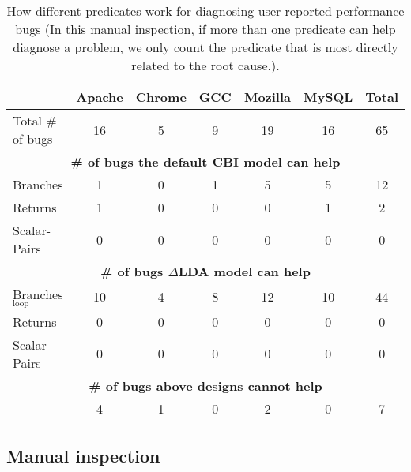 \begin{table*}[tb!]
\begin{adjustwidth}{-.5in}{-.5in}
\scriptsize
\centering
{
\begin{tabular}{lcccccc}
\toprule
&Apache&Chrome&GCC&Mozilla&MySQL&Total\\
\midrule
Total \# of bugs  & 16 & 5 & 9 & 19 & 16 & 65 \\
\midrule
\multicolumn{7}{c}{\bf \# of bugs the default CBI model can help}\\
\multicolumn{1}{l}{{ Branches} }
&1&0&1&5&5&12\\
\multicolumn{1}{l}{{ Returns} }
&1&0&0&0&1&2\\
\multicolumn{1}{l}{{ Scalar-Pairs} }
 &0&0&0&0&0&0\\
\midrule
\multicolumn{7}{c}{\bf \# of bugs $\Delta$LDA model can help}\\
\multicolumn{1}{l}{{ Branches$_{\text{loop}}$} }
&10&4&8&12&10&44\\
\multicolumn{1}{l}{{ Returns} }
&0 &0&0& 0&0&0\\
\multicolumn{1}{l}{{ Scalar-Pairs} }
&0 &0&0&0 &0&0\\
\midrule
\multicolumn{7}{c}{\bf \# of bugs above designs cannot help}\\
\multicolumn{1}{l}{{ } }
&4&1&0&2&0&7 \\
\bottomrule
\end{tabular}
}
\end{adjustwidth}
\caption{How different predicates work for diagnosing user-reported performance bugs (In this manual inspection, if more than one 
predicate can help diagnose a problem, we only count the predicate
that is most directly related to the root cause.).}
\label{tab:5_predicate}
\end{table*}

\subsection{Manual inspection}
\label{sec:5_manual_results}




